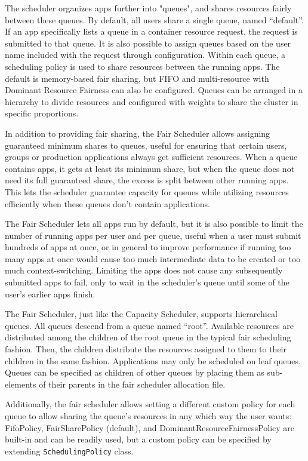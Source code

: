 The scheduler organizes apps further into "queues", and shares resources fairly between these queues. By default, all users share a single queue, named “default”. If an app specifically lists a queue in a container resource request, the request is submitted to that queue. It is also possible to assign queues based on the user name included with the request through configuration. Within each queue, a scheduling policy is used to share resources between the running apps. The default is memory-based fair sharing, but FIFO and multi-resource with Dominant Resource Fairness can also be configured. Queues can be arranged in a hierarchy to divide resources and configured with weights to share the cluster in specific proportions.

In addition to providing fair sharing, the Fair Scheduler allows assigning guaranteed minimum shares to queues, useful for ensuring that certain users, groups or production applications always get sufficient resources. When a queue contains apps, it gets at least its minimum share, but when the queue does not need its full guaranteed share, the excess is split between other running apps. This lets the scheduler guarantee capacity for queues while utilizing resources efficiently when these queues don’t contain applications.

The Fair Scheduler lets all apps run by default, but it is also possible to limit the number of running apps per user and per queue, useful when a user must submit hundreds of apps at once, or in general to improve performance if running too many apps at once would cause too much intermediate data to be created or too much context-switching. Limiting the apps does not cause any subsequently submitted apps to fail, only to wait in the scheduler’s queue until some of the user’s earlier apps finish.

The Fair Scheduler, just like the Capacity Scheduler, supports hierarchical queues. All queues descend from a queue named “root”. Available resources are distributed among the children of the root queue in the typical fair scheduling fashion. Then, the children distribute the resources assigned to them to their children in the same fashion. Applications may only be scheduled on leaf queues. Queues can be specified as children of other queues by placing them as sub-elements of their parents in the fair scheduler allocation file.

Additionally, the fair scheduler allows setting a different custom policy for each queue to allow sharing the queue’s resources in any which way the user wants: FifoPolicy, FairSharePolicy (default), and DominantResourceFairnessPolicy are built-in and can be readily used, but a custom policy can be specified by extending \texttt{SchedulingPolicy} class. 

